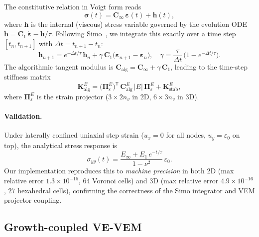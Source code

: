The constitutive relation in Voigt form reads
\begin{equation}
  \boldsymbol{\sigma}(t)
  = \mathbf{C}_\infty\,\boldsymbol{\varepsilon}(t) + \mathbf{h}(t),
  \label{eq:sls_stress}
\end{equation}
where $\mathbf{h}$ is the internal (viscous) stress variable governed by the
evolution ODE
$\dot{\mathbf{h}} = \mathbf{C}_1\,\dot{\boldsymbol{\varepsilon}}
- \mathbf{h}/\tau$.
Following Simo~\cite{Simo1987}, we integrate this exactly over a time step
$[t_n, t_{n+1}]$ with $\Delta t = t_{n+1} - t_n$:
\begin{equation}
  \mathbf{h}_{n+1}
  = e^{-\Delta t/\tau}\,\mathbf{h}_n
    + \gamma\,\mathbf{C}_1
      \bigl(\boldsymbol{\varepsilon}_{n+1} - \boldsymbol{\varepsilon}_n\bigr),
  \quad
  \gamma = \frac{\tau}{\Delta t}\,\bigl(1 - e^{-\Delta t/\tau}\bigr).
  \label{eq:simo_update}
\end{equation}
The algorithmic tangent modulus is
$\mathbf{C}_\mathrm{alg} = \mathbf{C}_\infty + \gamma\,\mathbf{C}_1$,
leading to the time-step stiffness matrix
\begin{equation}
  \mathbf{K}_\mathrm{alg}^E
  = \bigl(\boldsymbol{\Pi}_\varepsilon^E\bigr)^\mathsf{T}\,
    \mathbf{C}_\mathrm{alg}^E\, |E|\,
    \boldsymbol{\Pi}_\varepsilon^E
  + \mathbf{K}_\mathrm{stab}^E,
  \label{eq:ve_vem_K}
\end{equation}
where $\boldsymbol{\Pi}_\varepsilon^E$ is the strain projector
($3 \times 2n_v$ in 2D, $6 \times 3n_v$ in 3D).

\paragraph{Validation.}
Under laterally confined uniaxial step strain
($u_x = 0$ for all nodes, $u_y = \varepsilon_0$ on top),
the analytical stress response is
\begin{equation}
  \sigma_{yy}(t)
  = \frac{E_\infty + E_1\,e^{-t/\tau}}{1-\nu^2}\,\varepsilon_0.
  \label{eq:confined_analytical}
\end{equation}
Our implementation reproduces this to \emph{machine precision}
in both 2D (max relative error $1.3 \times 10^{-15}$, 64 Voronoi cells)
and 3D (max relative error $4.9 \times 10^{-16}$, 27 hexahedral cells),
confirming the correctness of the Simo integrator and VEM projector
coupling.

\subsection{Growth-coupled VE-VEM}
\label{sec:vem:growth}

